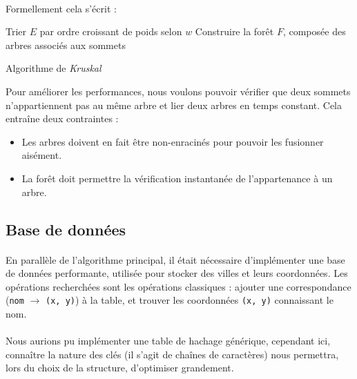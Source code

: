 \documentclass[a4paper]{article}
\begin{document}
\paragraph*{}
Formellement cela s'écrit :

\medskip

\begin{algorithm}[H]
\SetAlgoLined
{}
Trier $E$ par ordre croissant de poids selon $w$\;
Construire la forêt $F$, composée des arbres associés aux sommets\;
\caption{Algorithme de \emph{Kruskal}}
\end{algorithm}

\medskip

Pour améliorer les performances, nous voulons pouvoir vérifier que deux sommets n'appartiennent pas au même arbre et lier deux arbres en temps constant. Cela entraîne deux contraintes :
\begin{itemize}
\item Les arbres doivent en fait être non-enracinés pour pouvoir les fusionner aisément.
\item La forêt doit permettre la vérification instantanée de l'appartenance à un arbre.
\end{itemize}

\subsection{Base de données}

\paragraph*{}
En parallèle de l'algorithme principal, il était nécessaire d'implémenter une base de données performante, utilisée pour stocker des villes et leurs coordonnées. Les opérations recherchées sont les opérations classiques : ajouter une correspondance (\texttt{nom} $\rightarrow$ \texttt{(x, y)}) à la table, et trouver les coordonnées \texttt{(x, y)} connaissant le nom.

\paragraph*{}
Nous aurions pu implémenter une table de hachage générique, cependant ici, connaître la nature des clés (il s'agit de chaînes de caractères) nous permettra, lors du choix de la structure, d'optimiser grandement.
\end{document}

